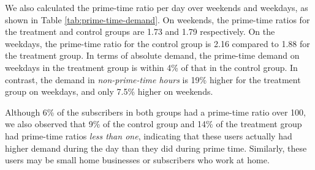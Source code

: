 

We also calculated the prime-time ratio per day over weekends and
weekdays, as shown in Table \ref{tab:prime-time-demand}.  On weekends,
the prime-time ratios for the treatment and control groups are 1.73 and
1.79 respectively. On the weekdays, the prime-time ratio for the control
group is 2.16 compared to 1.88 for the treatment group. 
In terms of absolute demand, the prime-time demand
on weekdays in the treatment group is within 4\%
of that in the control group. In contrast, the demand in
{\em non-prime-time hours} is 19\% higher for the treatment group on weekdays,
and only 7.5\% higher on weekends. 

Although 6\% of the subscribers in both groups had a prime-time ratio over
100, we also observed that 9\% of the control group and 14\% of the
treatment group had prime-time ratios {\em less than one}, indicating that
these users actually had higher demand during the day than they did
during prime time. Similarly, these users may be small home
businesses or subscribers who work at home.



